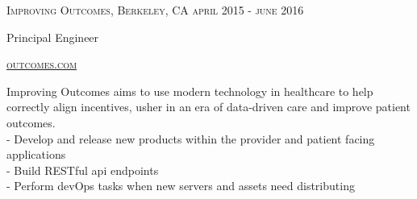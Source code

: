 {
  \textsc{\small{Improving Outcomes, Berkeley, CA
    \hfill
      {\raggedleft
        april 2015 - june 2016
      } \\
    }
  }
  {\raggedright\large {
      Principal Engineer
  }}

  \textsc{\small\href{http://www.outcomes.com}{outcomes.com}}

  \normalsize{\raggedright
    Improving Outcomes aims to use modern technology in healthcare to help correctly align incentives, usher in an era of data-driven care and improve patient outcomes. \\
    - Develop and release new products within the provider and patient facing applications \\
    - Build RESTful api endpoints \\
    - Perform devOps tasks when new servers and assets need distributing
  }
}

